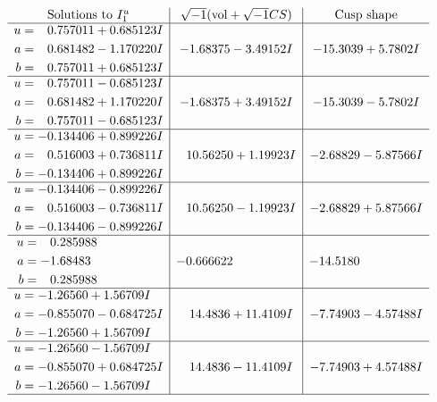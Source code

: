 \documentclass[1p]{elsarticle_modified}
\theoremstyle{definition}
\newcommand{\I}{\sqrt{-1}}
\begin{document}
$$\begin{array}{c|c|c}  
\text{Solutions to }I^u_{1}& \I (\text{vol} + \sqrt{-1}CS) & \text{Cusp shape}\\
 \hline 
\begin{aligned}
u &= \phantom{-}0.757011 + 0.685123 I \\
a &= \phantom{-}0.681482 - 1.170220 I \\
b &= \phantom{-}0.757011 + 0.685123 I\end{aligned}
 & -1.68375 - 3.49152 I & -15.3039 + 5.7802 I \\ \hline\begin{aligned}
u &= \phantom{-}0.757011 - 0.685123 I \\
a &= \phantom{-}0.681482 + 1.170220 I \\
b &= \phantom{-}0.757011 - 0.685123 I\end{aligned}
 & -1.68375 + 3.49152 I & -15.3039 - 5.7802 I \\ \hline\begin{aligned}
u &= -0.134406 + 0.899226 I \\
a &= \phantom{-}0.516003 + 0.736811 I \\
b &= -0.134406 + 0.899226 I\end{aligned}
 & \phantom{-}10.56250 + 1.19923 I & -2.68829 - 5.87566 I \\ \hline\begin{aligned}
u &= -0.134406 - 0.899226 I \\
a &= \phantom{-}0.516003 - 0.736811 I \\
b &= -0.134406 - 0.899226 I\end{aligned}
 & \phantom{-}10.56250 - 1.19923 I & -2.68829 + 5.87566 I \\ \hline\begin{aligned}
u &= \phantom{-}0.285988\phantom{ +0.000000I} \\
a &= -1.68483\phantom{ +0.000000I} \\
b &= \phantom{-}0.285988\phantom{ +0.000000I}\end{aligned}
 & -0.666622\phantom{ +0.000000I} & -14.5180\phantom{ +0.000000I} \\ \hline\begin{aligned}
u &= -1.26560 + 1.56709 I \\
a &= -0.855070 - 0.684725 I \\
b &= -1.26560 + 1.56709 I\end{aligned}
 & \phantom{-}14.4836 + 11.4109 I & -7.74903 - 4.57488 I \\ \hline\begin{aligned}
u &= -1.26560 - 1.56709 I \\
a &= -0.855070 + 0.684725 I \\
b &= -1.26560 - 1.56709 I\end{aligned}
 & \phantom{-}14.4836 - 11.4109 I & -7.74903 + 4.57488 I\\
 \hline 
 \end{array}$$\newpage\newpage\renewcommand{\arraystretch}{1}
\end{document}
